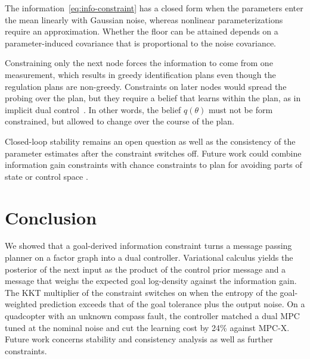 \documentclass{l4dc2027}
\newcommand{\claude}[2][] {\todo[inline,backgroundcolor=red!20!white, #1]{(Claude) #2}}
\begin{document}
The information~\eqref{eq:info-constraint} has a closed form when the parameters enter the mean linearly with Gaussian noise, whereas nonlinear parameterizations require an approximation. Whether the floor can be attained depends on a parameter-induced covariance that is proportional to the noise covariance.

Constraining only the next node forces the information to come from one measurement, which results in greedy identification plans even though the regulation plans are non-greedy. Constraints on later nodes would spread the probing over the plan, but they require a belief that learns within the plan, as in implicit dual control~\citep{mesbah2018stochastic}. In other words, the belief $q(\theta)$ must not be form constrained, but allowed to change over the course of the plan. 

Closed-loop stability remains an open question as well as the consistency of the parameter estimates after the constraint switches off. Future work could combine information gain constraints with chance constraints to plan for avoiding parts of state or control space \citep{van2021chance}.

\section{Conclusion}\label{sec:conclusion}

We showed that a goal-derived information constraint turns a message passing planner on a factor graph into a dual controller. Variational calculus yields the posterior of the next input as the product of the control prior message and a message that weighs the expected goal log-density against the information gain. The KKT multiplier of the constraint switches on when the entropy of the goal-weighted prediction exceeds that of the goal tolerance plus the output noise. On a quadcopter with an unknown compass fault, the controller matched a dual MPC tuned at the nominal noise and cut the learning cost by 24\% against MPC-X. Future work concerns stability and consistency analysis as well as further constraints.
\end{document}
